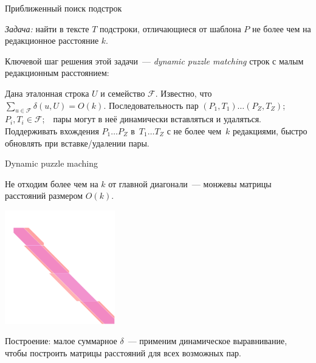 \documentclass[svgnames]{beamer}
\begin{document}
\begin{frame}{Приближенный поиск подстрок}

\begin{block}{\vspace*{-3ex}}
  {\it Задача:} найти в тексте \(T\) подстроки, отличающиеся от шаблона \(P\) не более чем на редакционное расстояние \(k\).
\end{block} \vspace{4mm}

Ключевой шаг решения этой задачи~— {\it dynamic puzzle matching} строк с малым редакционным расстоянием:

\begin{block}{\vspace*{-3ex}}
  Дана эталонная строка \(U\) и семейство \(\mathcal F\).
  Известно, что \(\sum_{u \in \mathcal F} \delta (u, U) = O(k)\).
  Последовательность пар \((P_1, T_1) \ldots (P_Z, T_Z)\);\ \ 
  \(P_i, T_i \in \mathcal F\);\ \ пары могут в неё динамически
  вставляться и удаляться. Поддерживать вхождения
  \(P_1 \ldots P_Z\) в~\(T_1 \ldots T_Z\) с не более
  чем~\(k\) редакциями, быстро обновлять при вставке/удалении пары.
\end{block} \vspace{8mm}

\end{frame}


\begin{frame}{Dynamic puzzle maching}

Не отходим более чем на \(k\) от главной диагонали~— монжевы матрицы расстояний размером \(O(k)\).

\begin{center}
  \includegraphics[width=4.8cm]{svg/wellnitz}
\end{center}

Построение: малое суммарное \(\delta\)~— применим динамическое выравнивание, чтобы построить матрицы расстояний для всех возможных пар.

\end{frame}
\end{document}
